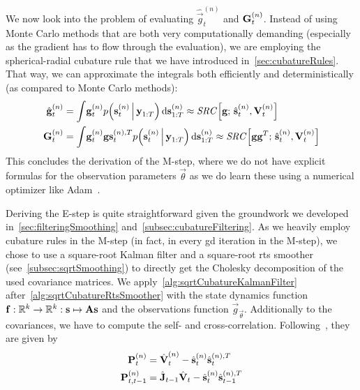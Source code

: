 	We now look into the problem of evaluating \( \hat{\vec{g}}_t^{(n)} \) and \( \boldsymbol{\mathrm{G}}_t^{(n)} \). Instead of using Monte Carlo methods that are both very computationally demanding (especially as the gradient has to flow through the evaluation), we are employing the spherical-radial cubature rule that we have introduced in~\autoref{sec:cubatureRules}. That way, we can approximate the integrals both efficiently and deterministically (as compared to Monte Carlo methods):
	\begin{align}
		\hat{\boldsymbol{\mathrm{g}}}_t^{(n)} &= \int\! \boldsymbol{\mathrm{g}}_t^{(n)} p\Big(\boldsymbol{\mathrm{s}}_t^{(n)} \,\Big\vert\, \boldsymbol{\mathrm{y}}_{1:T}\Big) \dd{\boldsymbol{\mathrm{s}}_{1:T}^{(n)}} \approx \mathit{SRC}\Big[\boldsymbol{\mathrm{g}};\, \hat{\boldsymbol{\mathrm{s}}}_t^{(n)}, \boldsymbol{\mathrm{V}}_t^{(n)}\Big]  \label{eq:ngkgeval} \\
		\boldsymbol{\mathrm{G}}_t^{(n)}       &= \int\! \boldsymbol{\mathrm{g}}_t^{(n)} \boldsymbol{\mathrm{g}}\boldsymbol{\mathrm{s}}_t^{(n), T} p\Big(\boldsymbol{\mathrm{s}}_t^{(n)} \,\Big\vert\, \boldsymbol{\mathrm{y}}_{1:T} \Big) \dd{\boldsymbol{\mathrm{s}}_{1:T}^{(n)}} \approx \mathit{SRC}\Big[\boldsymbol{\mathrm{g}} \boldsymbol{\mathrm{g}}^T;\, \hat{\boldsymbol{\mathrm{s}}}_t^{(n)}, \boldsymbol{\mathrm{V}}_t^{(n)}\Big]  \label{eq:ngkGeval}
	\end{align}
	This concludes the derivation of the M-step, where we do not have explicit formulas for the observation parameters \(\vec{\theta}\) as we do learn these using a numerical optimizer like Adam~\cite{kingmaAdamMethodStochastic2017}.

	Deriving the E-step is quite straightforward given the groundwork we developed in~\autoref{sec:filteringSmoothing} and~\autoref{subsec:cubatureFiltering}. As we heavily employ cubature rules in the M-step (in fact, in every \ac{gd} iteration in the M-step), we chose to use a square-root Kalman filter and a square-root \ac{rts} smoother (see~\autoref{subsec:sqrtSmoothing}) to directly get the Cholesky decomposition of the used covariance matrices. We apply~\autoref{alg:sqrtCubatureKalmanFilter} after~\autoref{alg:sqrtCubatureRtsSmoother} with the state dynamics function \( \boldsymbol{\mathrm{f}} : \mathbb{R}^k \to \mathbb{R}^k : \boldsymbol{\mathrm{s}} \mapsto \boldsymbol{\mathrm{A}} \boldsymbol{\mathrm{s}} \) and the observations function \( \vec{g}_{\vec{\theta}} \). Additionally to the covariances, we have to compute the self- and cross-correlation. Following~\cite{minkaHiddenMarkovModels1999}, they are given by
	\begin{align*}
		\boldsymbol{\mathrm{P}}_t^{(n)} &= \hat{\boldsymbol{\mathrm{V}}}_t^{(n)} - \hat{\boldsymbol{\mathrm{s}}}_t^{(n)} \hat{\boldsymbol{\mathrm{s}}}_t^{(n), T} \\
		\boldsymbol{\mathrm{P}}_{t, t - 1}^{(n)} &= \hat{\boldsymbol{\mathrm{J}}}_{t - 1} \hat{\boldsymbol{\mathrm{V}}}_t - \hat{\boldsymbol{\mathrm{s}}}_{t}^{(n)} \hat{\boldsymbol{\mathrm{s}}}_{t - 1}^{(n), T}
	\end{align*}


